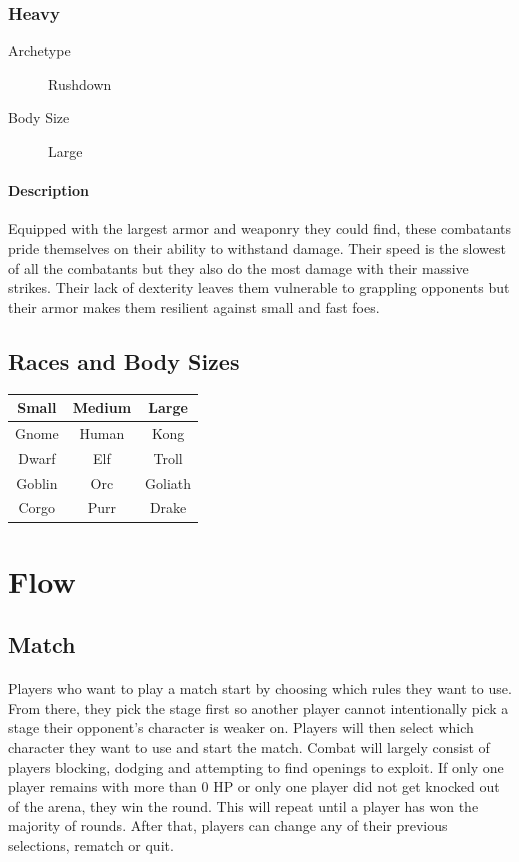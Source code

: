 \subsubsection{Heavy}

\begin{description}
    \item[Archetype] Rushdown
    \item[Body Size] Large
\end{description}

\paragraph{Description} Equipped with the largest armor and weaponry they could find, these combatants pride themselves on their ability to withstand damage. Their speed is the slowest of all the combatants but they also do the most damage with their massive strikes. Their lack of dexterity leaves them vulnerable to grappling opponents but their armor makes them resilient against small and fast foes.

\subsection{Races and Body Sizes}

\begin{table}[h!]
    \begin{tabular}{c|c|c}
    Small  & Medium & Large   \\
    \hline
    Gnome  & Human  & Kong    \\
    Dwarf  & Elf    & Troll   \\
    Goblin & Orc    & Goliath \\
    Corgo  & Purr   & Drake  
    \end{tabular}
\end{table}

\section{Flow}

\subsection{Match}

\paragraph{} Players who want to play a match start by choosing which rules they want to use. From there, they pick the stage first so another player cannot intentionally pick a stage their opponent's character is weaker on. Players will then select which character they want to use and start the match. Combat will largely consist of players blocking, dodging and attempting to find openings to exploit. If only one player remains with more than 0 HP or only one player did not get knocked out of the arena, they win the round. This will repeat until a player has won the majority of rounds. After that, players can change any of their previous selections, rematch or quit.

